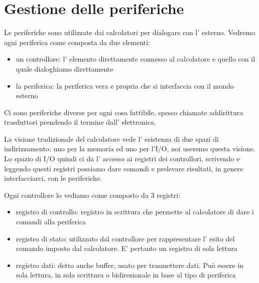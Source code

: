 \section{Gestione delle periferiche}
Le periferiche sono utilizzate dai calcolatori per dialogare con l' esterno.
Vedremo ogni periferica come composta da due elementi:
\begin{itemize}
    \item un controllore: l' elemento direttamente connesso al calcolatore e quello con il quale dialoghiamo direttamente
    \item la periferica: la periferica vera e propria che si interfaccia con il mondo esterno
\end{itemize}
Ci sono periferiche diverse per ogni cosa fattibile, spesso chiamate addirittura trasduttori prendendo il termine dall' elettronica.

La visione tradizionale del calcolatore vede l' esistenza di due spazi di indirizzamento: uno per la memoria ed uno per l'I/O, noi useremo questa visione.
Lo spazio di I/O quindi ci da l' accesso ai registri dei controllori, scrivendo e leggendo questi registri possiamo dare comandi e prelevare risultati, in genere interfacciarci, con le periferiche.

Ogni controllore lo vediamo come composto da 3 registri:
\begin{itemize}
    \item registro di controllo: registro in scrittura che permette al calcolatore di dare i comandi alla periferica
    \item registro di stato: utilizzato dal controllore per rappresentare l' esito del comando imposto dal calcolatore. E' pertanto un registro di sola lettura
    \item registro dati: detto anche buffer, usato per trasmettere dati. Può essere in sola lettura, in sola scrittura o bidirezionale in base al tipo di periferica 
\end{itemize}

